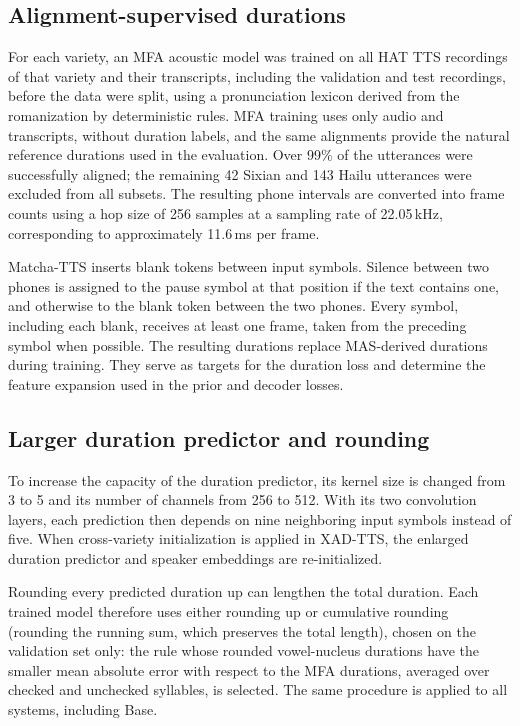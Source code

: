 \documentclass[conference,a4paper]{IEEEtran}
\begin{document}
\subsection{Alignment-supervised durations}
For each variety, an MFA acoustic model was trained on all HAT TTS recordings of that variety and their transcripts, including the validation and test recordings, before the data were split, using a pronunciation lexicon derived from the romanization by deterministic rules. MFA training uses only audio and transcripts, without duration labels, and the same alignments provide the natural reference durations used in the evaluation. Over 99\% of the utterances were successfully aligned; the remaining 42 Sixian and 143 Hailu utterances were excluded from all subsets. The resulting phone intervals are converted into frame counts using a hop size of 256 samples at a sampling rate of 22.05\,kHz, corresponding to approximately 11.6\,ms per frame.

Matcha-TTS inserts blank tokens between input symbols. Silence between two phones is assigned to the pause symbol at that position if the text contains one, and otherwise to the blank token between the two phones. Every symbol, including each blank, receives at least one frame, taken from the preceding symbol when possible. The resulting durations replace MAS-derived durations during training. They serve as targets for the duration loss and determine the feature expansion used in the prior and decoder losses.

\subsection{Larger duration predictor and rounding}
To increase the capacity of the duration predictor, its kernel size is changed from 3 to 5 and its number of channels from 256 to 512. With its two convolution layers, each prediction then depends on nine neighboring input symbols instead of five. When cross-variety initialization is applied in XAD-TTS, the enlarged duration predictor and speaker embeddings are re-initialized.

Rounding every predicted duration up can lengthen the total duration. Each trained model therefore uses either rounding up or cumulative rounding (rounding the running sum, which preserves the total length), chosen on the validation set only: the rule whose rounded vowel-nucleus durations have the smaller mean absolute error with respect to the MFA durations, averaged over checked and unchecked syllables, is selected. The same procedure is applied to all systems, including Base.
\end{document}
